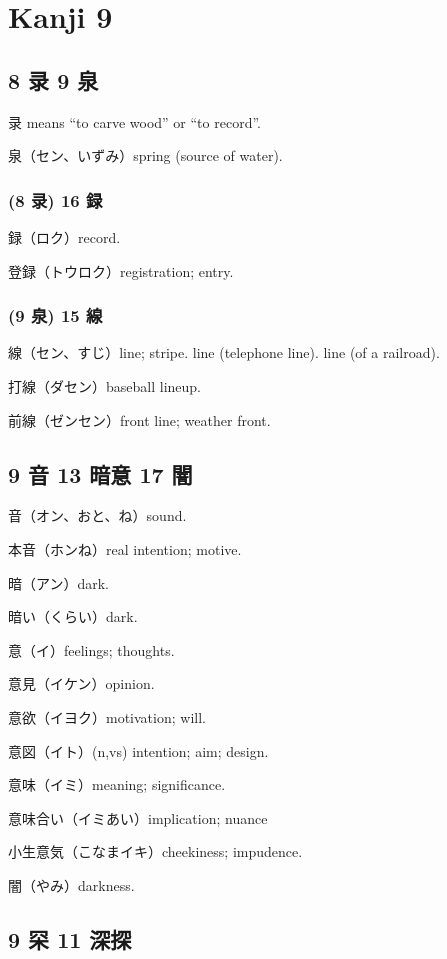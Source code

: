 \chapter{Kanji 9}

\section{8 录 9 泉}

录 means ``to carve wood'' or ``to record''.

泉（セン、いずみ）spring (source of water).

\subsection{(8 录) 16 録}

録（ロク）record.

登録（トウロク）registration; entry.

\subsection{(9 泉) 15 線}

線（セン、すじ）line; stripe.
line (telephone line).
line (of a railroad).

打線（ダセン）baseball lineup.

前線（ゼンセン）front line; weather front.

\section{9 音 13 暗意 17 闇}

音（オン、おと、ね）sound.

本音（ホンね）real intention; motive.

暗（アン）dark.

暗い（くらい）dark.

意（イ）feelings; thoughts.

意見（イケン）opinion.

意欲（イヨク）motivation; will.

意図（イト）(n,vs) intention; aim; design.

意味（イミ）meaning; significance.

意味合い（イミあい）implication; nuance

小生意気（こなまイキ）cheekiness; impudence.

闇（やみ）darkness.

\section{9 罙 11 深探}

